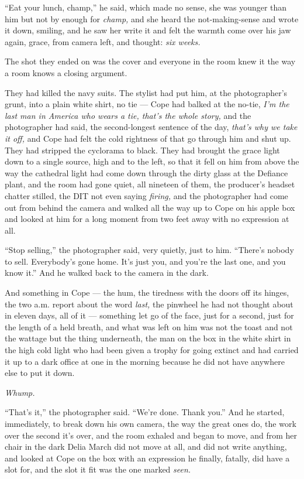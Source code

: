 \documentclass[11pt,openany]{book}
\newcommand{\scenebreak}{\par\vspace{0.5\baselineskip}\begin{center}\textasteriskcentered\quad\textasteriskcentered\quad\textasteriskcentered\end{center}\vspace{0.5\baselineskip}\par}
\begin{document}
``Eat your lunch, champ,'' he said, which made no sense, she was younger than him but not by enough for \textit{champ,} and she heard the not-making-sense and wrote it down, smiling, and he saw her write it and felt the warmth come over his jaw again, grace, from camera left, and thought: \textit{six weeks.}


\scenebreak


The shot they ended on was the cover and everyone in the room knew it the way a room knows a closing argument.

They had killed the navy suits. The stylist had put him, at the photographer's grunt, into a plain white shirt, no tie --- Cope had balked at the no-tie, \textit{I'm the last man in America who wears a tie, that's the whole story,} and the photographer had said, the second-longest sentence of the day, \textit{that's why we take it off,} and Cope had felt the cold rightness of that go through him and shut up. They had stripped the cyclorama to black. They had brought the grace light down to a single source, high and to the left, so that it fell on him from above the way the cathedral light had come down through the dirty glass at the Defiance plant, and the room had gone quiet, all nineteen of them, the producer's headset chatter stilled, the DIT not even saying \textit{firing,} and the photographer had come out from behind the camera and walked all the way up to Cope on his apple box and looked at him for a long moment from two feet away with no expression at all.

``Stop selling,'' the photographer said, very quietly, just to him. ``There's nobody to sell. Everybody's gone home. It's just you, and you're the last one, and you know it.'' And he walked back to the camera in the dark.

And something in Cope --- the hum, the tiredness with the doors off its hinges, the two a.m. report about the word \textit{last,} the pinwheel he had not thought about in eleven days, all of it --- something let go of the face, just for a second, just for the length of a held breath, and what was left on him was not the toast and not the wattage but the thing underneath, the man on the box in the white shirt in the high cold light who had been given a trophy for going extinct and had carried it up to a dark office at one in the morning because he did not have anywhere else to put it down.

\textit{Whump.}

``That's it,'' the photographer said. ``We're done. Thank you.'' And he started, immediately, to break down his own camera, the way the great ones do, the work over the second it's over, and the room exhaled and began to move, and from her chair in the dark Delia March did not move at all, and did not write anything, and looked at Cope on the box with an expression he finally, fatally, did have a slot for, and the slot it fit was the one marked \textit{seen.}
\end{document}
